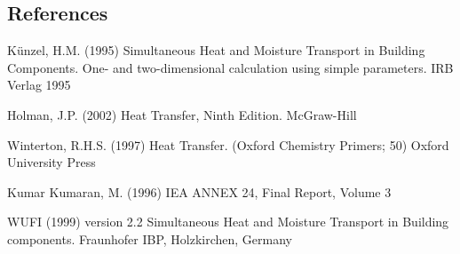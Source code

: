 \subsection{References}\label{references-012}

Künzel, H.M. (1995) Simultaneous Heat and Moisture Transport in Building Components. One- and two-dimensional calculation using simple parameters. IRB Verlag 1995

Holman, J.P. (2002) Heat Transfer, Ninth Edition. McGraw-Hill

Winterton, R.H.S. (1997) Heat Transfer. (Oxford Chemistry Primers; 50) Oxford University Press

Kumar Kumaran, M. (1996) IEA ANNEX 24, Final Report, Volume 3

WUFI (1999) version 2.2 Simultaneous Heat and Moisture Transport in Building components. Fraunhofer IBP, Holzkirchen, Germany
